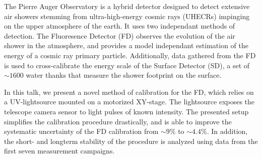 \documentclass{scdpg}
\begin{document}
\begin{scAbstract}
\scBeginText
The Pierre Auger Observatory is a hybrid detector designed to detect extensive air showers stemming from ultra-high-energy cosmic rays (UHECRs) impinging on the upper atmosphere of the earth. It uses two independant methods of detection. The Fluoresence Detector (FD) observes the evolution of the air shower in the atmosphere, and provides a model independant estimation of the energy of a cosmic ray primary particle. Additionally, data gathered from the FD is used to cross-calibrate the energy scale of the Surface Detector (SD), a set of $\sim1600$ water thanks that measure the shower footprint on the surface.

In this talk, we present a novel method of calibration for the FD, which relies on a UV-lightsource mounted on a motorized XY-stage. The lightsource exposes the telescope camera sensor to light pulses of known intensity. The presented setup simplifies the calibration procedure drastically, and is able to improve the systematic uncertainty of the FD calibration from $\sim9\%$ to $\sim4.4\%$. In addition, the short- and longterm stability of the procedure is analyzed using data from the first seven measurement campaigns.
\scEndText
{}
\end{scAbstract}
\end{document}
